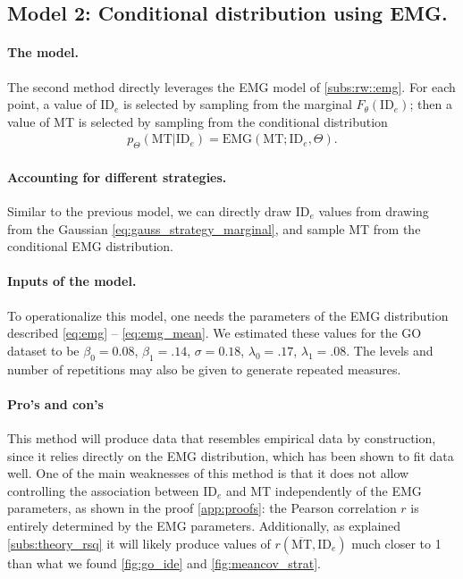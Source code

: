 \documentclass[manuscript,review,anonymous]{acmart}
\newcommand{\mmt}{\ensuremath{\overline{\text{MT}}}\xspace}
\newcommand{\ide}{\ensuremath{{\text{ID}_e}}\xspace}
\begin{document}
\subsection{Model 2: Conditional distribution using EMG.}
\paragraph{The model.} The second method directly leverages the EMG model of \autoref{subs:rw::emg}. For each point, a value of $\ide$ is selected by sampling from the marginal $F_{\theta}(\ide)$; then a value of MT is selected by sampling from the conditional distribution
\begin{align}
	p_{\Theta}(\text{MT}|\ide) = \text{EMG}(\text{MT}; \ide, \Theta).
\end{align}

\paragraph{Accounting for different strategies.} Similar to the previous model, we can directly draw \ide values from drawing from the Gaussian \autoref{eq:gauss_strategy_marginal}, and sample MT from the conditional EMG distribution.

\paragraph{Inputs of the model.} To operationalize this model, one needs the parameters of the EMG distribution described \autoref{eq:emg} -- \autoref{eq:emg_mean}. We estimated these values for the GO dataset to be $\beta_0 = 0.08$, $\beta_1 = .14$, $\sigma=0.18$, $\lambda_0 = .17$, $\lambda_1 = .08$. The levels and number of repetitions may also be given to generate repeated measures.

\paragraph{Pro's and con's} This method will produce data that resembles empirical data by construction, since it relies directly on the EMG distribution, which has been shown to fit data well. One of the main weaknesses of this method is that it does not allow controlling the association between \ide and MT \hypertarget{res:method_2__correlation}{independently} of the EMG parameters, as shown in the proof \autoref{app:proofs}: the Pearson correlation $r$ is entirely determined by the EMG parameters. Additionally, as explained \autoref{subs:theory_rsq} it will likely produce values of $r(\mmt, \ide)$ much closer to 1 than what we found \autoref{fig:go_ide} and \autoref{fig:meancov_strat}.
\end{document}
